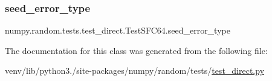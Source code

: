 \subsubsection{\texorpdfstring{seed\+\_\+error\+\_\+type}{seed\_error\_type}}
{\footnotesize\ttfamily numpy.\+random.\+tests.\+test\+\_\+direct.\+Test\+S\+F\+C64.\+seed\+\_\+error\+\_\+type}



The documentation for this class was generated from the following file\+:\begin{DoxyCompactItemize}
\item 
venv/lib/python3./site-\/packages/numpy/random/tests/\hyperlink{test__direct_8py}{test\+\_\+direct.\+py}\end{DoxyCompactItemize}
